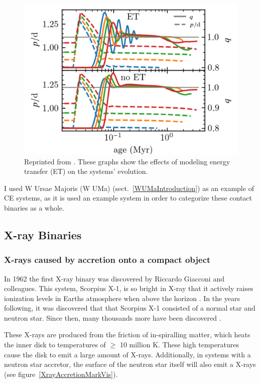 \documentclass[12pt, a4paper]{article}
\begin{document}
        \begin{figure}[H]
            \centering
            \includegraphics[scale = .3]{figs/reused-figs/q-ratio_evolution_farby.png}
            \caption{Reprinted from \parencite{Fabry_2025}. These graphs show the effects of modeling energy transfer (ET) on the systems' evolution.}
            \label{qEvolution}
        \end{figure}
        
        I used W Ursae Majoris (W UMa) (sect.~\ref{WUMaIntroduction}) as an example of CE systems, as it is used an example system in order to categorize these contact binaries as a whole.
    \subsection{X-ray Binaries} 
        \subsubsection{X-rays caused by accretion onto a compact object} \label{XrayAccretion}
            In 1962 the first X-ray binary was discovered by Riccardo Giacconi and colleagues. This system, Scorpius X-1, is so bright in X-ray that it actively raises ionization levels in Earths atmosphere when above the horizon \parencite{TaurisvandenHeuvel+2023} \parencite{Giacconi_1962}. In the years following, it was discovered that that Scorpius X-1 consisted of a normal star and neutron star. Since then, many thousands more have been discovered \parencite{Haardt_1993}.

            These X-rays are produced from the friction of in-spiralling matter, which heats the inner disk to temperatures of $\geq$ 10 million K. These high temperatures cause the disk to emit a large amount of X-rays. Additionally, in systems with a neutron star accretor, the surface of the neutron star itself will also emit a X-rays \parencite{TaurisvandenHeuvel+2023} (see figure~\ref{XrayAccretionMarkVis}). 
\end{document}

